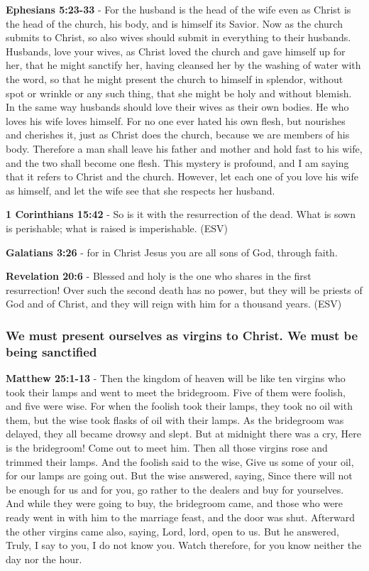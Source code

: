 \documentclass[11pt]{article}
\begin{document}
\textbf{Ephesians 5:23-33} - For the husband is the head of the wife even as Christ is the head of the church, his body, and is himself its Savior. Now as the church submits to Christ, so also wives should submit in everything to their husbands. Husbands, love your wives, as Christ loved the church and gave himself up for her, that he might sanctify her, having cleansed her by the washing of water with the word, so that he might present the church to himself in splendor, without spot or wrinkle or any such thing, that she might be holy and without blemish. In the same way husbands should love their wives as their own bodies. He who loves his wife loves himself. For no one ever hated his own flesh, but nourishes and cherishes it, just as Christ does the church, because we are members of his body. Therefore a man shall leave his father and mother and hold fast to his wife, and the two shall become one flesh. This mystery is profound, and I am saying that it refers to Christ and the church. However, let each one of you love his wife as himself, and let the wife see that she respects her husband.

\textbf{1 Corinthians 15:42} -  So is it with the resurrection of the dead.  What is sown is perishable; what is raised is imperishable. (ESV)

\textbf{Galatians 3:26} - for in Christ Jesus you are all sons of God, through faith.

\textbf{Revelation 20:6} - Blessed and holy is the one who shares in the first resurrection! Over such the second death has no power, but they will be priests of God and of Christ, and they will reign with him for a thousand years. (ESV)

\subsubsection{We must present ourselves as virgins to Christ. We must be being sanctified}
\label{sec:orge25f81a}
\textbf{Matthew 25:1-13} - Then the kingdom of heaven will be like ten virgins who took their lamps and went to meet the bridegroom. Five of them were foolish, and five were wise. For when the foolish took their lamps, they took no oil with them, but the wise took flasks of oil with their lamps. As the bridegroom was delayed, they all became drowsy and slept. But at midnight there was a cry, Here is the bridegroom! Come out to meet him. Then all those virgins rose and trimmed their lamps. And the foolish said to the wise, Give us some of your oil, for our lamps are going out. But the wise answered, saying, Since there will not be enough for us and for you, go rather to the dealers and buy for yourselves. And while they were going to buy, the bridegroom came, and those who were ready went in with him to the marriage feast, and the door was shut. Afterward the other virgins came also, saying, Lord, lord, open to us. But he answered, Truly, I say to you, I do not know you. Watch therefore, for you know neither the day nor the hour.
\end{document}
